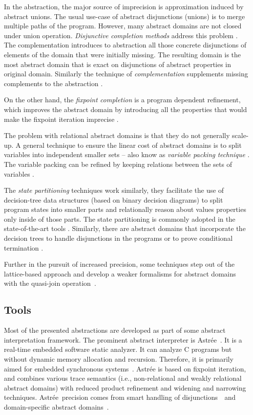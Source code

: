 In the abstraction, the major source of imprecision is approximation induced by
abstract unions. The usual use-case of abstract disjunctions (unions) is to
merge multiple paths of the program. However, many abstract domains are not
closed under union operation.  \emph{Disjunctive completion methods} address
this problem \cite{File1999}. The complementation introduces to abstraction all
those concrete disjunctions of elements of the domain that were initially
missing.  The resulting domain is the most abstract domain that is exact on
disjunctions of abstract properties in original domain. Similarly the technique
of \emph{complementation} supplements missing complements to the abstraction
\cite{Cortesi1995}.

On the other hand, the \emph{fixpoint completion} is a program dependent refinement,
which improves the abstract domain by introducing all the properties that
would make the fixpoint iteration imprecise \cite{Giacobazzi2000,
Giacobazzi2001}.

The problem with relational abstract domains is that they do not generally
scale-up. A general technique to ensure the linear cost of abstract domains is
to split variables into independent smaller sets -- also know as \emph{variable
packing technique} \cite{Mine2006}. The variable packing can be refined by
keeping relations between the sets of variables \cite{Bouzaziz2012}.

The \emph{state partitioning} techniques \cite{Muchnick1981} work similarly,
they facilitate the use of decision-tree data structures (based on binary
decision diagrams) to split program states into smaller parts and relationally
reason about values properties only inside of those parts. The state
partitioning is commonly adopted in the state-of-the-art tools
\cite{Cousot2010, Bertrane2015}. Similarly, there are abstract domains that
incorporate the decision trees to handle disjunctions in the programs
\cite{Cousot2010a} or to prove conditional termination \cite{Urban2010}.

Further in the pursuit of increased precision, some techniques step out of the
lattice-based approach and develop a weaker formalisms for abstract domains with
the quasi-join ope\-ra\-tion~\cite{Gange2013}.

\subsection{Tools}

Most of the presented abstractions are developed as part of some abstract
interpretation framework. The prominent abstract interpreter is
Astrée~\cite{Astree}. It is a real-time embedded software static analyzer. It
can analyze C programs but without dynamic memory allocation and recursion.
Therefore, it is primarily aimed for embedded synchronous
systems~\cite{Delmas2007, Souyris2007, Bouissou2009, Bertrane2015}.  Astrée is
based on fixpoint iteration, and combines various trace semantics (i.e.,
non-relational and weakly relational abstract domains) with reduced product
refinement and widening and narrowing techniques. Astrée precision comes from
smart handling of disjunctions~\cite{Blanchet2003, Mauborgne2005} and
domain-specific abstract domains~\cite{Feret2004, Feret2005}.

